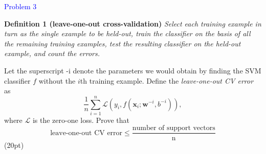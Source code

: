 \textcolor{blue}{Problem 3}
\par \textbf{Definition 1 (leave-one-out cross-validation)} \textit{Select each training example in turn as the single example to be held-out, train the classifier on the basis of all the remaining training examples, test the resulting classifier on the held-out example, and count the errors.}
\par Let the superscript -i denote the parameters we would obtain by finding the SVM classifier $f$ without the $i$th training example. Define the \textit{leave-one-out CV error} as
\begin{equation}
    \frac{1}{n}\sum_{i=1}^n\mathcal{L}(y_i,f(\mathbf{x}_i;\mathbf{w}^{-i},b^{-i})),
\end{equation}
where $\mathcal{L}$ is the zero-one loss. Prove that
\begin{equation}
    \text{leave-one-out CV error}\leq \frac{\text{number of support vectors}}{\text{n}}
\end{equation} (20pt)


